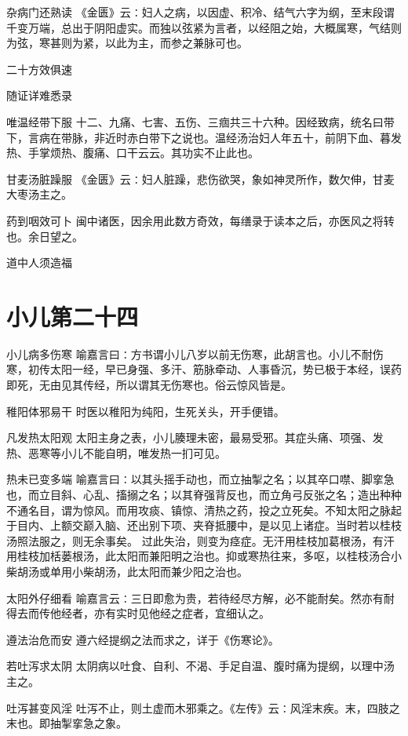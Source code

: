 \documentclass[a4paper,12pt,UTF8,twoside]{ctexbook}
\begin{document}
    杂病门还熟读
    《金匮》云∶妇人之病，以因虚、积冷、结气六字为纲，至末段谓千变万端，总出于阴阳虚实。而独以弦紧为言者，以经阻之始，大概属寒，气结则为弦，寒甚则为紧，以此为主，而参之兼脉可也。
    
    二十方效俱速
    
    随证详难悉录
    
    唯温经带下服
    十二、九痛、七害、五伤、三痼共三十六种。因经致病，统名曰带下，言病在带脉，非近时赤白带下之说也。温经汤治妇人年五十，前阴下血、暮发热、手掌烦热、腹痛、口干云云。其功实不止此也。
    
    甘麦汤脏躁服
    《金匮》云∶妇人脏躁，悲伤欲哭，象如神灵所作，数欠伸，甘麦大枣汤主之。
    
    药到咽效可卜
    闽中诸医，因余用此数方奇效，每缮录于读本之后，亦医风之将转也。余日望之。
    
    道中人须造福
    \chapter{小儿第二十四}
      小儿病多伤寒
    喻嘉言曰∶方书谓小儿八岁以前无伤寒，此胡言也。小儿不耐伤寒，初传太阳一经，早已身强、多汗、筋脉牵动、人事昏沉，势已极于本经，误药即死，无由见其传经，所以谓其无伤寒也。俗云惊风皆是。
    
    稚阳体邪易干
    时医以稚阳为纯阳，生死关头，开手便错。
    
    凡发热太阳观
    太阳主身之表，小儿腠理未密，最易受邪。其症头痛、项强、发热、恶寒等小儿不能自明，唯发热一扪可见。
    
    热未已变多端
    喻嘉言曰∶以其头摇手动也，而立抽掣之名；以其卒口噤、脚挛急也，而立目斜、心乱、搐搦之名；以其脊强背反也，而立角弓反张之名；造出种种不通名目，谓为惊风。而用攻痰、镇惊、清热之药，投之立死矣。不知太阳之脉起于目内、上额交巅入脑、还出别下项、夹脊抵腰中，是以见上诸症。当时若以桂枝汤照法服之，则无余事矣。
    过此失治，则变为痉症。无汗用桂枝加葛根汤，有汗用桂枝加栝蒌根汤，此太阳而兼阳明之治也。抑或寒热往来，多呕，以桂枝汤合小柴胡汤或单用小柴胡汤，此太阳而兼少阳之治也。
    
    太阳外仔细看
    喻嘉言云∶三日即愈为贵，若待经尽方解，必不能耐矣。然亦有耐得去而传他经者，亦有实时见他经之症者，宜细认之。
    
    遵法治危而安
    遵六经提纲之法而求之，详于《伤寒论》。
    
    若吐泻求太阴
    太阴病以吐食、自利、不渴、手足自温、腹时痛为提纲，以理中汤主之。
    
    吐泻甚变风淫
    吐泻不止，则土虚而木邪乘之。《左传》云∶风淫末疾。末，四肢之末也。即抽掣挛急之象。
    
\end{document}
